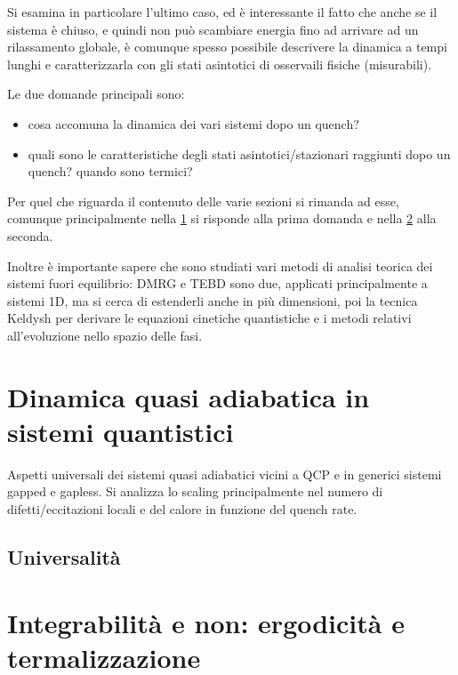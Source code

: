 \documentclass[a4paper,10pt,twocolumn]{article}
\begin{document}
\noindent Si esamina in particolare l'ultimo caso, ed è interessante il fatto che anche se il sistema è chiuso, e quindi non può scambiare energia fino ad arrivare ad un rilassamento globale, è comunque spesso possibile descrivere la dinamica a tempi lunghi e caratterizzarla con gli stati asintotici di osservaili fisiche (misurabili).

Le due domande principali sono:

\begin{itemize}
	\item cosa accomuna la dinamica dei vari sistemi dopo un quench?
	\item quali sono le caratteristiche degli stati asintotici/stazionari raggiunti dopo un quench? quando sono termici?
\end{itemize}

Per quel che riguarda il contenuto delle varie sezioni si rimanda ad esse, comunque principalmente nella \cref{nearAdiabtic} si risponde alla prima domanda e nella \cref{integrability} alla seconda.
\newline

Inoltre è importante sapere che sono studiati vari metodi di analisi teorica dei sistemi fuori equilibrio: DMRG e TEBD sono due, applicati principalmente a sistemi 1D, ma si cerca di estenderli anche in più dimensioni, poi la tecnica Keldysh per derivare le equazioni cinetiche quantistiche e i metodi relativi all'evoluzione nello spazio delle fasi.


\section{Dinamica quasi adiabatica in sistemi quantistici}
\label{nearAdiabtic}

Aspetti universali dei sistemi quasi adiabatici vicini a QCP e in generici sistemi gapped e gapless. Si analizza lo scaling principalmente nel numero di difetti/eccitazioni locali e del calore in funzione del quench rate.

\subsection{Universalità}

\section{Integrabilità e non: ergodicità e termalizzazione}
\label{integrability}
\end{document}
